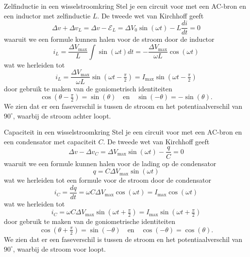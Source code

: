 \begin{pro}{Zelfinductie in een wisselstroomkring}
    Stel je een circuit voor met een AC-bron en een inductor met zelfinductie $L$. De tweede wet van Kirchhoff geeft
    \begin{equation*}
        \Delta v + \Delta v_L = \Delta v - \mathcal{E}_{L} = \Delta V_{0}\sin(\omega t) - L\dfrac{di}{dt} = 0
    \end{equation*}
    waaruit we een formule kunnen halen voor de stroom door de inductor
    \begin{equation*}
        i_L = \dfrac{\Delta V_{\max}}{L}\int\sin(\omega t)dt = -\dfrac{\Delta V_{\max}}{\omega L}\cos(\omega t)
    \end{equation*}
    wat we herleiden tot 
    \begin{equation*}
        i_L = \dfrac{\Delta V_{\max}}{\omega L}\sin(\omega t - \tfrac{\pi}{2}) = I_{\max}\sin(\omega t - \tfrac{\pi}{2})
    \end{equation*}
    door gebruik te maken van de goniometrisch identiteiten 
    \begin{equation*}
        \cos(\theta - \tfrac{\pi}{2}) = \sin(\theta) \quad \text{en} \quad \sin(-\theta) = -\sin(\theta).
    \end{equation*}
    We zien dat er een faseverschil is tussen de stroom en het potentiaalverschil van $90^{\circ}$, waarbij de stroom achter loopt.
\end{pro}

\begin{pro}{Capaciteit in een wisselstroomkring}
    Stel je een circuit voor met een AC-bron en een condensator met capaciteit $C$. De tweede wet van Kirchhoff geeft
    \begin{equation*}
        \Delta v - \Delta v_{C} = \Delta V_{\max}\sin(\omega t) - \dfrac{q}{C} = 0
    \end{equation*}
    waaruit we een formule kunnen halen voor de lading op de condensator
    \begin{equation*}
        q = C\Delta V_{\max}\sin(\omega t)
    \end{equation*}
    wat we herleiden tot een formule voor de stroom door de condensator
    \begin{equation*}
        i_C = \dfrac{dq}{dt} = \omega C\Delta V_{\max}\cos(\omega t) = I_{\max}\cos(\omega t)
    \end{equation*}
    wat we herleiden tot
    \begin{equation*}
        i_C = \omega C\Delta V_{\max}\sin(\omega t + \tfrac{\pi}{2}) = I_{\max}\sin(\omega t + \tfrac{\pi}{2})
    \end{equation*}
    door gebruik te maken van de goniometrische identiteiten
    \begin{equation*}
        \cos(\theta + \tfrac{\pi}{2}) = \sin(-\theta) \quad \text{en} \quad \cos(-\theta) = \cos(\theta).
    \end{equation*}
    We zien dat er een faseverschil is tussen de stroom en het potentiaalverschil van $90^{\circ}$, waarbij de stroom voor loopt.
\end{pro}

